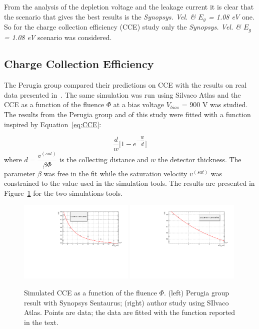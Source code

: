 From the analysis of the depletion voltage and the leakage current it is clear that the scenario 
that gives the best results is the {\it Synopsys. Vel. \& $E_g$ = 1.08 eV} one.
So for the charge collection efficiency (CCE) study only the {\it Synopsys. Vel. \& $E_g$ = 1.08 eV} scenario 
was considered.

\subsection{Charge Collection Efficiency}

The Perugia group compared their predictions on CCE with the results on real data presented 
in~\cite{Affolder:2010zz}. The same simulation was run using Silvaco Atlas and the CCE as a function 
of the fluence $\Phi$ at a bias voltage $V_{bias}$ = 900 V was studied. The results from the Perugia 
group and of this study were fitted with a function inspired by Equation~\ref{eq:CCE}:

\begin{equation}
\dfrac{d}{w}\Big[ 1-e^{-\dfrac{w}{d}} \Big]
\label{eq:SimpleCCE}
\end{equation} 
where $d=\dfrac{v^{(sat)}}{\beta\Phi}$ is the collecting distance and $w$ the detector thickness.
The parameter $\beta$ was free in the fit while the saturation velocity $v^{(sat)}$ was constrained 
to the value used in the simulation tools. The results are presented in Figure~\ref{fig:cce_sims} 
for the two simulations tools.
\begin{figure}[!htpb]
\centering
\includegraphics[width=0.49\textwidth]{cce_sims.pdf}
\includegraphics[width=0.49\textwidth]{cce_no_mult_Perugia_Synopsys_Eg108_900V.pdf}
\caption{\label{fig:cce_sims}Simulated CCE as a function of the fluence $\Phi$. (left) Perugia group 
result with Synopsys Sentaurus; (right) author study using SIlvaco Atlas. Points are data; the 
data are fitted with the function reported in the text.}
\end{figure}

